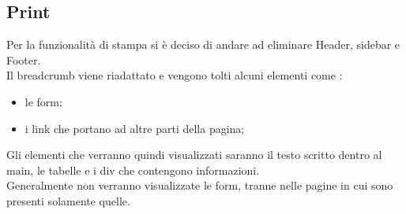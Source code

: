   \subsection{Print}
    Per la funzionalità di stampa si è deciso di andare ad eliminare Header, sidebar e Footer. \\
    Il breadcrumb viene riadattato e vengono tolti alcuni elementi come :
    \begin{itemize}
      \item le form;
      \item i link che portano ad altre parti della pagina;
    \end{itemize}
    Gli elementi che verranno quindi visualizzati saranno il testo scritto dentro al main, le tabelle e i div che contengono informazioni. \\
    Generalmente non verranno visualizzate le form, tranne nelle pagine in cui sono presenti solamente quelle.